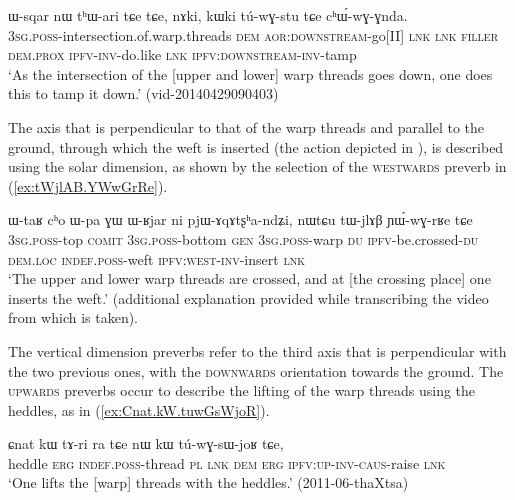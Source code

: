  \begin{exe}
\ex \label{ex:thari.chWGnda}
\gll ɯ-sqar nɯ tʰɯ-ari tɕe tɕe, nɤki, kɯki tú-wɣ-stu tɕe cʰɯ́-wɣ-ɣnda. \\
\textsc{3sg}.\textsc{poss}-intersection.of.warp.threads \textsc{dem} \textsc{aor}:\textsc{downstream}-go[II] \textsc{lnk} \textsc{lnk} \textsc{filler} \textsc{dem}.\textsc{prox} \textsc{ipfv}-\textsc{inv}-do.like \textsc{lnk} \textsc{ipfv}:\textsc{downstream}-\textsc{inv}-tamp \\
\glt `As the intersection of the [upper and lower] warp threads goes down, one does this to tamp it down.' (vid-20140429090403) 
\end{exe} 

The axis that is perpendicular to that of the warp threads and parallel to the ground, through which the weft is inserted (the action depicted in ), is described using the solar dimension, as shown by the selection of the \textsc{westwards} preverb in (\ref{ex:tWjlAB.YWwGrRe}).

\begin{exe}
\ex \label{ex:tWjlAB.YWwGrRe}
\gll ɯ-taʁ cʰo ɯ-pa ɣɯ ɯ-ʁjar ni pjɯ-ɤqɤtʂʰa-ndʑi, nɯtɕu tɯ-jlɤβ ɲɯ́-wɣ-rʁe tɕe   \\
\textsc{3sg}.\textsc{poss}-top \textsc{comit} \textsc{3sg}.\textsc{poss}-bottom \textsc{gen} \textsc{3sg}.\textsc{poss}-warp \textsc{du} \textsc{ipfv}-be.crossed-\textsc{du} \textsc{dem}.\textsc{loc} \textsc{indef}.\textsc{poss}-weft \textsc{ipfv}:\textsc{west}-\textsc{inv}-insert \textsc{lnk} \\
\glt `The upper and lower warp threads are crossed, and at [the crossing place] one inserts the weft.' (additional explanation provided while transcribing the video from which  is taken).%
\end{exe} 

The vertical dimension preverbs refer to the third axis that is perpendicular with the two previous ones, with the \textsc{downwards} orientation towards the ground. The \textsc{upwards} preverbs occur to describe the lifting of the warp threads using the heddles, as in (\ref{ex:Cnat.kW.tuwGsWjoR}).

\begin{exe}
\ex \label{ex:Cnat.kW.tuwGsWjoR}
\gll ɕnat kɯ tɤ-ri ra tɕe nɯ kɯ tú-wɣ-sɯ-joʁ tɕe,\\
heddle \textsc{erg} \textsc{indef}.\textsc{poss}-thread \textsc{pl} \textsc{lnk} \textsc{dem} \textsc{erg} \textsc{ipfv}:\textsc{up}-\textsc{inv}-\textsc{caus}-raise \textsc{lnk} \\
\glt `One lifts the [warp] threads with the heddles.' (2011-06-thaXtsa)
\end{exe}  

